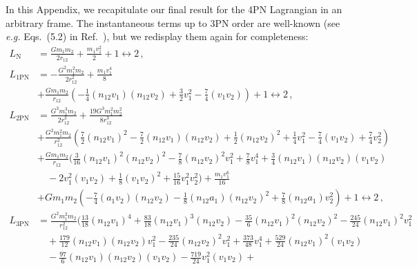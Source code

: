 \documentclass[prd,preprint,superscriptaddress,tightenlines,nofootinbib,
  eqsecnum,showpacs]{revtex4}
\begin{document}
In this Appendix, we recapitulate our final result for the 4PN Lagrangian in an
arbitrary frame. The instantaneous terms up to 3PN order are well-known (see
\textit{e.g.} Eqs.~(5.2) in Ref.~\cite{BBBFMa}), but we redisplay them again
for completeness:
%
{\allowdisplaybreaks
\begin{subequations}\label{L3PN}
\begin{align}
L_\text{N} &= \frac{G m_1 m_2}{2 r_{12}} + \frac{m_1 v_1^2}{2} + 1
\leftrightarrow 2\,,\\
L_\text{1PN} &= - \frac{G^2 m_1^2 m_2}{2 r_{12}^2} + \frac{m_1
  v_1^4}{8} \nonumber \\ & + \frac{G m_1 m_2}{r_{12}} \left( -
\frac{1}{4} (n_{12}v_1) (n_{12}v_2) + \frac{3}{2} v_1^2 - \frac{7}{4}
(v_1v_2) \right) + 1 \leftrightarrow 2\,,\\
L_\text{2PN} &= \frac{G^3 m_1^3 m_2}{2 r_{12}^3} + \frac{19 G^3 m_1^2
  m_2^2}{8 r_{12}^3} \nonumber \\ &  + \frac{G^2 m_1^2
  m_2}{r_{12}^2} \left( \frac{7}{2} (n_{12}v_1)^2 - \frac{7}{2}
(n_{12}v_1) (n_{12}v_2) + \frac{1}{2}(n_{12}v_2)^2 + \frac{1}{4} v_1^2
- \frac{7}{4} (v_1v_2) + \frac{7}{4} v_2^2 \right) \nonumber \\ &
+ \frac{G m_1 m_2}{r_{12}} \bigg( \frac{3}{16}
(n_{12}v_1)^2 (n_{12}v_2)^2 - \frac{7}{8} (n_{12}v_2)^2 v_1^2 +
\frac{7}{8} v_1^4 + \frac{3}{4} (n_{12}v_1) (n_{12}v_2) (v_1v_2)
\nonumber \\ & \quad    - 2 v_1^2 (v_1v_2) +
\frac{1}{8} (v_1v_2)^2 + \frac{15}{16} v_1^2 v_2^2 \bigg) + \frac{m_1
  v_1^6}{16} \nonumber \\ &  + G m_1 m_2 \left( -
\frac{7}{4} (a_1 v_2) (n_{12}v_2) - \frac{1}{8} (n_{12} a_1)
(n_{12}v_2)^2 + \frac{7}{8} (n_{12} a_1) v_2^2 \right) + 1
\leftrightarrow 2\,,\\
L_\text{3PN} &= \frac{G^2 m_1^2 m_2}{r_{12}^2} \bigg( \frac{13}{18}
(n_{12}v_1)^4 + \frac{83}{18} (n_{12}v_1)^3 (n_{12}v_2) - \frac{35}{6}
(n_{12}v_1)^2 (n_{12}v_2)^2 - \frac{245}{24} (n_{12}v_1)^2 v_1^2
\nonumber \\ & \quad + \frac{179}{12} (n_{12}v_1) (n_{12}v_2) v_1^2 -
\frac{235}{24} (n_{12}v_2)^2 v_1^2 + \frac{373}{48} v_1^4 +
\frac{529}{24} (n_{12}v_1)^2 (v_1v_2) \nonumber \\ & \quad - \frac{97}{6}
(n_{12}v_1) (n_{12}v_2) (v_1v_2) - \frac{719}{24} v_1^2 (v_1v_2) +

\end{align}
\end{subequations}}
\end{document}
